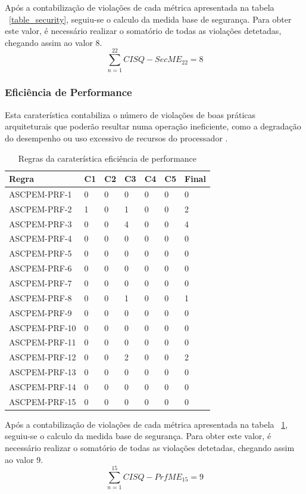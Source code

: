 \documentclass[openany,10pt,a4paper]{article}
\begin{document}
Após a contabilização de violações de cada métrica apresentada na tabela ~\ref{table_security}, seguiu-se o calculo da medida base de segurança. Para obter este valor, é necessário realizar o somatório de todas as violações detetadas, chegando assim ao valor 8.
$$\sum_{n=1}^{22} CISQ - SecME_{22} = 8$$

\subsubsection{Eficiência de Performance}
Esta caraterística contabiliza o número de violações de boas práticas arquiteturais que poderão resultar numa operação ineficiente, como a degradação do desempenho ou uso excessivo de recursos do processador \cite{OMG_Performance}.
\begin{longtable}{|p{1.3in}|p{0.28in}|p{0.28in}|p{0.28in}|p{0.28in}|p{0.28in}|p{0.35in}|}
	\caption{Regras da caraterística eficiência de performance}
	\label{table_performance}
	\endhead
	\hline	
	\textbf{Regra} & \textbf{C1} & \textbf{C2} & \textbf{C3} & \textbf{C4} & \textbf{C5} & \textbf{Final} \\ \hline
ASCPEM-PRF-1 & 0 & 0 & 0 & 0 & 0 & 0 \\ \hline
ASCPEM-PRF-2 & 1 & 0 & 1 & 0 & 0 & 2 \\ \hline
ASCPEM-PRF-3 & 0 & 0 & 4 & 0 & 0 & 4 \\ \hline
ASCPEM-PRF-4 & 0 & 0 & 0 & 0 & 0 & 0 \\ \hline
ASCPEM-PRF-5 & 0 & 0 & 0 & 0 & 0 & 0 \\ \hline
ASCPEM-PRF-6 & 0 & 0 & 0 & 0 & 0 & 0 \\ \hline
ASCPEM-PRF-7 & 0 & 0 & 0 & 0 & 0 & 0 \\ \hline
ASCPEM-PRF-8 & 0 & 0 & 1 & 0 & 0 & 1 \\ \hline
ASCPEM-PRF-9 & 0 & 0 & 0 & 0 & 0 & 0 \\ \hline
ASCPEM-PRF-10 & 0 & 0 & 0 & 0 & 0 & 0 \\ \hline
ASCPEM-PRF-11 & 0 & 0 & 0 & 0 & 0 & 0 \\ \hline
ASCPEM-PRF-12 & 0 & 0 & 2 & 0 & 0 & 2 \\ \hline
ASCPEM-PRF-13 & 0 & 0 & 0 & 0 & 0 & 0 \\ \hline
ASCPEM-PRF-14 & 0 & 0 & 0 & 0 & 0 & 0 \\ \hline
ASCPEM-PRF-15 & 0 & 0 & 0 & 0 & 0 & 0 \\ \hline
	\end{longtable} 

Após a contabilização de violações de cada métrica apresentada na tabela ~\ref{table_performance}, seguiu-se o calculo da medida base de segurança. Para obter este valor, é necessário realizar o somatório de todas as violações detetadas, chegando assim ao valor 9.
$$\sum_{n=1}^{15} CISQ - PrfME_{15} = 9$$
\end{document}
